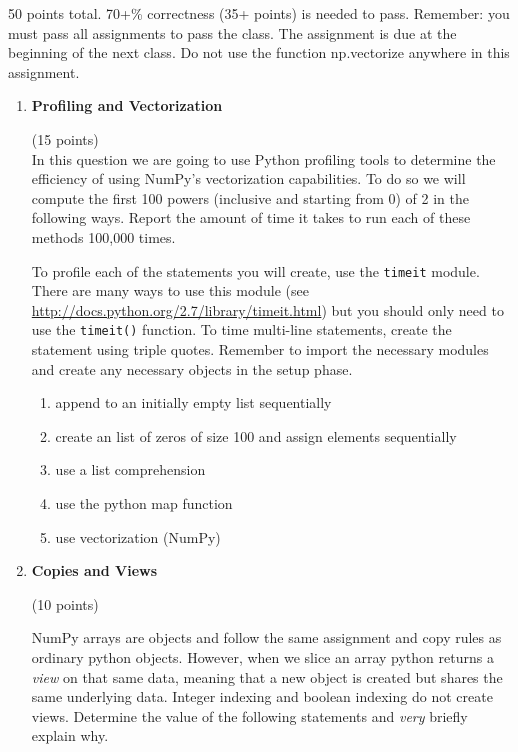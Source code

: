 \documentclass{article}
\newcounter{points}
\newcommand\setpoints[1]{\addtocounter{points}{#1}(#1 points)}
\begin{document}
\pagestyle{fancy}

50  points total.  70+\% correctness (35+ points) is needed to pass. Remember: you must pass all assignments to pass the class.  The assignment is due at the beginning of the next class. Do not use the function np.vectorize anywhere in this assignment.

\begin{enumerate}
\item \textbf{Profiling and Vectorization} \setpoints{15} \\
In this question we are going to use Python profiling tools to determine the efficiency of using NumPy's vectorization capabilities. To do so we will compute the first 100 powers (inclusive and starting from 0) of 2 in the following ways. Report the amount of time it takes to run each of these methods 100,000 times.
\vspace{.1in}

To profile each of the statements you will create, use the \texttt{timeit} module. There are many ways to use this module (see
\url{ http://docs.python.org/2.7/library/timeit.html}) but you should only need to use the \texttt{timeit()} function. To time multi-line statements, create the statement using triple quotes. Remember to import the necessary modules and create any necessary objects in the setup phase.

\begin{enumerate}
\item append  to an initially empty list sequentially 
\item create an list of zeros of size 100 and assign elements sequentially
\item use a list comprehension
\item use the python map function
\item use vectorization (NumPy)
\end{enumerate}

\item \textbf{Copies and Views} \setpoints{10}

NumPy arrays are objects and follow the same assignment and copy rules as ordinary python objects. However, when we slice an array python returns a \textit{view} on that same data, meaning that a new object is created but shares the same underlying data. Integer indexing and boolean indexing do not create views. Determine the value of the following statements and \textit{very }briefly explain why. 
\begin{enumerate}



\end{enumerate}
\end{enumerate}
\end{document}
